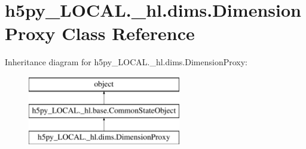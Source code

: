 \hypertarget{classh5py__LOCAL_1_1__hl_1_1dims_1_1DimensionProxy}{}\section{h5py\+\_\+\+L\+O\+C\+A\+L.\+\_\+hl.\+dims.\+Dimension\+Proxy Class Reference}
\label{classh5py__LOCAL_1_1__hl_1_1dims_1_1DimensionProxy}
Inheritance diagram for h5py\+\_\+\+L\+O\+C\+A\+L.\+\_\+hl.\+dims.\+Dimension\+Proxy\+:\begin{figure}[H]
\begin{center}
\leavevmode
\includegraphics[height=3.000000cm]{classh5py__LOCAL_1_1__hl_1_1dims_1_1DimensionProxy}
\end{center}
\end{figure}
